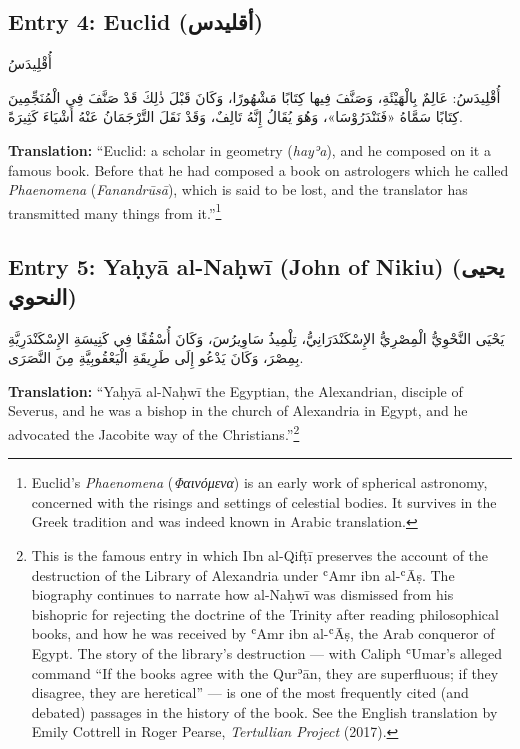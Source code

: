 \documentclass[11pt,a4paper]{article}
\def\RL#1{\beginR#1\endR}
\newcommand{\arabicblock}[1]{{\arabicfont\RL{#1}}}
\newcommand{\textarabic}[1]{{\arabicfont\RL{#1}}}
\begin{document}
\subsection{Entry 4: Euclid \textarabic{(أقليدس)}}

\arabicblock{%
أُقْلِيدَسُ

أُقْلِيدَسُ: عَالِمٌ بِالْهَيْئَةِ، وَصَنَّفَ فِيها كِتَابًا مَشْهُورًا، وَكَانَ قَبْلَ ذٰلِكَ قَدْ صَنَّفَ فِي الْمُنَجِّمِينَ كِتَابًا سَمَّاهُ «فَنَنْدَرُوْسَا»، وَهُوَ يُقَالُ إِنَّهُ تَالِفٌ، وَقَدْ نَقَلَ التَّرْجَمَانُ عَنْهُ أَشْيَاءَ كَثِيرَةً.%
}

\vspace{0.3cm}

\noindent\textbf{Translation:} ``Euclid: a scholar in geometry (\textit{hayʾa}), and he composed on it a famous book. Before that he had composed a book on astrologers which he called \textit{Phaenomena} (\textit{Fanandrūsā}), which is said to be lost, and the translator has transmitted many things from it.''\footnote{Euclid's \textit{Phaenomena} (\textit{Φαινόμενα}) is an early work of spherical astronomy, concerned with the risings and settings of celestial bodies. It survives in the Greek tradition and was indeed known in Arabic translation.}

\subsection{Entry 5: Yaḥyā al-Naḥwī (John of Nikiu) \textarabic{(يحيى النحوي)}}

\arabicblock{%
يَحْيَى النَّحْوِيُّ الْمِصْرِيُّ الإِسْكَنْدَرَانِيُّ، تِلْمِيذُ سَاوِيرُسَ، وَكَانَ أُسْقُفًا فِي كَنِيسَةِ الإِسْكَنْدَرِيَّةِ بِمِصْرَ، وَكَانَ يَدْعُو إِلَى طَرِيقَةِ الْيَعْقُوبِيَّةِ مِنَ النَّصَرَى.%
}

\vspace{0.3cm}

\noindent\textbf{Translation:} ``Yaḥyā al-Naḥwī the Egyptian, the Alexandrian, disciple of Severus, and he was a bishop in the church of Alexandria in Egypt, and he advocated the Jacobite way of the Christians.''\footnote{This is the famous entry in which Ibn al-Qifṭī preserves the account of the destruction of the Library of Alexandria under ʿAmr ibn al-ʿĀṣ. The biography continues to narrate how al-Naḥwī was dismissed from his bishopric for rejecting the doctrine of the Trinity after reading philosophical books, and how he was received by ʿAmr ibn al-ʿĀṣ, the Arab conqueror of Egypt. The story of the library's destruction --- with Caliph ʿUmar's alleged command ``If the books agree with the Qurʾān, they are superfluous; if they disagree, they are heretical'' --- is one of the most frequently cited (and debated) passages in the history of the book. See the English translation by Emily Cottrell in Roger Pearse, \textit{Tertullian Project} (2017).}
\end{document}
